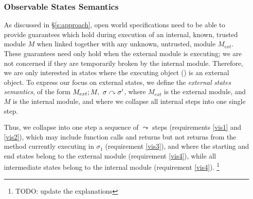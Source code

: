 \subsubsection{Observable States Semantics}

As discussed in \S \ref{s:approach}, 
{open world specifications need to be able to provide}
guarantees which hold
during execution of an internal, 
known, trusted module $M$ when linked together with any
unknown, untrusted, module $M_{ext}$. These guarantees need only hold 
when the external module is executing; we are not concerned if they are
temporarily broken by the internal module. Therefore, we are only interested in states where the
executing object () is an external object. 
To express our focus on external states, we define the  \emph{external states semantics}, of the form 
$M_{ext} ; M,\ \sigma \curvearrowright \sigma'$, where $M_{ext}$ is the external
module, and $M$ is the internal module, and where we
collapse all internal steps into one single step.

 

\sd{
\begin{definition}[{Observable} States Semantics]
\label{def:pair-reduce}
For    modules $M$,  $M_{ext}$, and     states $\sigma$, $\sigma'$, 
we say that $\ \ \ \ \ \ \ \ \reduction{M_{ext}}{M}{\sigma}{\sigma'}\ \ \ \ \ \ \ \ $ if and only if there exist 
$n\in\mathbb{N}$, and states $\sigma_0$,...$\sigma_n$, such that
\begin{enumerate}
\item
\label{vis2}
$M_{ext} \circ M, \sigma  \leadstoUp  \sigma'$  
\item
\label{vis4}
$\class {\prg{this}}{\sigma}, \class {\prg{this}} {\sigma'}\!\in\! M_{ext}$, %
\end{enumerate} 
\end{definition}
}
{ Thus, we collapse into one step a sequence of $\leadsto$ steps (requirements \ref{vis1}  and \ref{vis2}), which may include function calls and returns but
 not returns from the method currently executing in $\sigma_1$ (requirement  \ref{vis3}), and where the starting and end states belong to the external module (requirement  \ref{vis4}), while all intermediate states belong to the internal module (requirement  \ref{vis4}).}
\footnote{TODO: update the explanations}

